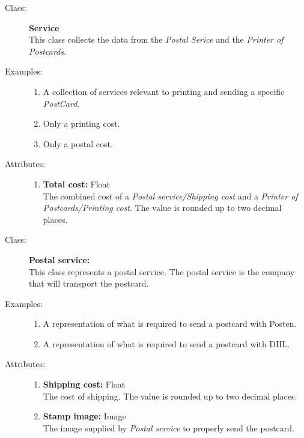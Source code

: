 \documentclass[10pt,a4paper]{article}
\begin{document}
\begin{description}
\item[Class:] \textbf{Service} \hfill \\
This class collects the data from the \textit{Postal Serice} and the \textit{Printer of Postcards}. 

\item[Examples:] \hfill
\begin{enumerate}
\item A collection of services relevant to printing and sending a specific \textit{PostCard}.
\item Only a printing cost.
\item Only a postal cost.
\end{enumerate}

\item[Attributes:] \hfill
\begin{enumerate}
\item \textbf{Total cost:} Float \hfill \\The combined cost of a \textit{Postal service/Shipping cost} and a \textit{Printer of Postcards/Printing cost}. The value is rounded up to two decimal places.
\end{enumerate}
\end{description}

\hrulefill

\begin{description}
\item[Class:] \textbf{Postal service:} \hfill \\
This class represents a postal service. The postal service is the company that will transport the postcard. 

\item[Examples:] \hfill
\begin{enumerate}
\item A representation of what is required to send a postcard with Posten.
\item A representation of what is required to send a postcard with DHL.
\end{enumerate}

\item[Attributes:] \hfill
\begin{enumerate}
\item \textbf{Shipping cost:} Float \hfill \\The cost of shipping. The value is rounded up to two decimal places.
\item \textbf{Stamp image:} Image \hfill \\The image supplied by \textit{Postal service} to properly send the postcard.
\end{enumerate}
\end{description}
\end{document}
